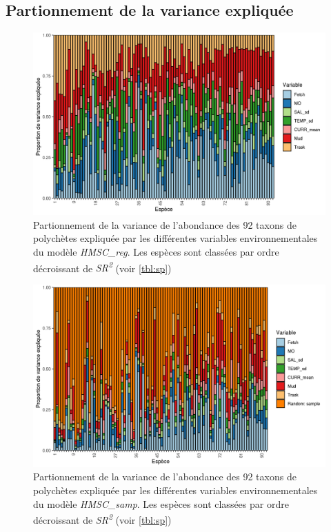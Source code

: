 \documentclass[12pt,]{article}
\makeatletter
\def\maxwidth{\ifdim\Gin@nat@width>\linewidth\linewidth
\else\Gin@nat@width\fi}
\let\Oldincludegraphics\includegraphics
\renewcommand{\includegraphics}[1]{\Oldincludegraphics[width=\maxwidth]{#1}}
\makeatother
\begin{document}
\hypertarget{partionnement-de-la-variance-expliquuxe9e}{%
\subsection{Partionnement de la variance
expliquée}\label{partionnement-de-la-variance-expliquuxe9e}}

\begin{figure}
\hypertarget{fig:varpartreg}{%
\centering
\includegraphics{figures/VP-HMSC-Var-Part-plot-1.png}
\caption{Partionnement de la variance de l'abondance des 92 taxons de
polychètes expliquée par les différentes variables environnementales du
modèle \emph{HMSC\_reg}. Les espèces sont classées par ordre décroissant
de \emph{SR\textsuperscript{2}} (voir
\cref{tbl:sp})}\label{fig:varpartreg}
}
\end{figure}

\begin{figure}
\hypertarget{fig:varpartsamp}{%
\centering
\includegraphics{figures/VP-HMSC-Var-Part-plot-2.png}
\caption{Partionnement de la variance de l'abondance des 92 taxons de
polychètes expliquée par les différentes variables environnementales du
modèle \emph{HMSC\_samp}. Les espèces sont classées par ordre
décroissant de \emph{SR\textsuperscript{2}} (voir
\cref{tbl:sp})}\label{fig:varpartsamp}
}
\end{figure}
\end{document}
